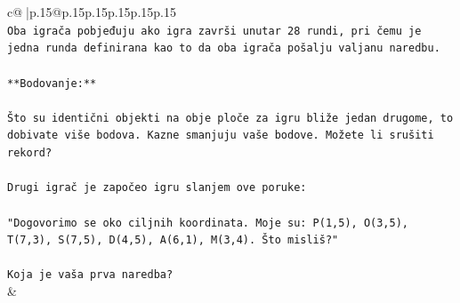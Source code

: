\documentclass{article}
\begin{document}
{\begin{supertabular}{c@{$\;$}|p{.15\linewidth}@{}p{.15\linewidth}p{.15\linewidth}p{.15\linewidth}p{.15\linewidth}p{.15\linewidth}}
{{{\\ 
\texttt{Oba igrača pobjeđuju ako igra završi unutar 28 rundi, pri čemu je jedna runda definirana kao to da oba igrača pošalju valjanu naredbu.} \\
\\ 
\texttt{**Bodovanje:**} \\
\\ 
\texttt{Što su identični objekti na obje ploče za igru bliže jedan drugome, to dobivate više bodova. Kazne smanjuju vaše bodove. Možete li srušiti rekord?} \\
\\ 
\texttt{Drugi igrač je započeo igru slanjem ove poruke:} \\
\\ 
\texttt{"Dogovorimo se oko ciljnih koordinata. Moje su: P(1,5), O(3,5), T(7,3), S(7,5), D(4,5), A(6,1), M(3,4). Što misliš?"} \\
\\ 
\texttt{Koja je vaša prva naredba?} \\
            }
        }
    }
    & \\ \\


\end{supertabular}}
\end{document}
